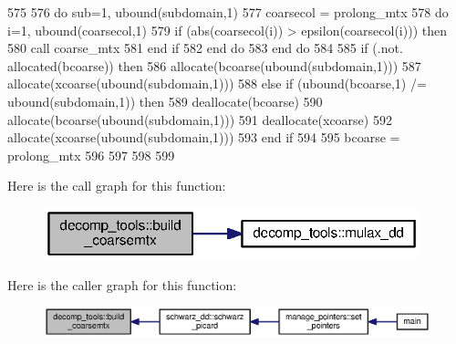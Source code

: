 \begin{DoxyCode}
575       
576       \textcolor{keywordflow}{do} sub=1, ubound(subdomain,1)
577         coarsecol = prolong_mtx%
578         \textcolor{keywordflow}{do} i=1, ubound(coarsecol,1)
579           \textcolor{keywordflow}{if} (abs(coarsecol(i)) > epsilon(coarsecol(i))) \textcolor{keywordflow}{then}
580             \textcolor{keyword}{call }coarse_mtx%
581 \textcolor{keywordflow}{          end if}
582 \textcolor{keywordflow}{        end do}
583 \textcolor{keywordflow}{      end do}
584       
585       \textcolor{keywordflow}{if} (.not. \textcolor{keyword}{allocated}(bcoarse)) \textcolor{keywordflow}{then}
586         \textcolor{keyword}{allocate}(bcoarse(ubound(subdomain,1)))
587         \textcolor{keyword}{allocate}(xcoarse(ubound(subdomain,1)))
588       \textcolor{keywordflow}{else} \textcolor{keywordflow}{if} (ubound(bcoarse,1) /= ubound(subdomain,1)) \textcolor{keywordflow}{then}
589         \textcolor{keyword}{deallocate}(bcoarse)
590         \textcolor{keyword}{allocate}(bcoarse(ubound(subdomain,1)))
591         \textcolor{keyword}{deallocate}(xcoarse)
592         \textcolor{keyword}{allocate}(xcoarse(ubound(subdomain,1)))
593 \textcolor{keywordflow}{      end if}
594       
595       bcoarse = prolong_mtx%
596 
597     
598       
599     
\end{DoxyCode}


Here is the call graph for this function\+:\nopagebreak
\begin{figure}[H]
\begin{center}
\leavevmode
\includegraphics[width=309pt]{namespacedecomp__tools_ac3dffa95121aa59d12a617f71d43f193_cgraph}
\end{center}
\end{figure}




Here is the caller graph for this function\+:\nopagebreak
\begin{figure}[H]
\begin{center}
\leavevmode
\includegraphics[width=350pt]{namespacedecomp__tools_ac3dffa95121aa59d12a617f71d43f193_icgraph}
\end{center}
\end{figure}


